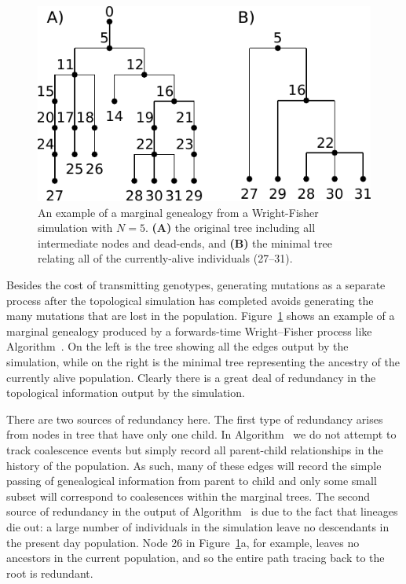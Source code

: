 \documentclass{article}
\begin{document}
\begin{figure}
    \begin{center}
        \includegraphics{wf-before-after}
    \end{center}
    \caption{An example of a marginal genealogy from a Wright-Fisher simulation
    with $N=5$. \textbf{(A)} the original tree including all
    intermediate nodes and dead-ends, and \textbf{(B)} the minimal tree
    relating all of the currently-alive individuals (27--31).
    \label{fig:wf-trees}
    }
\end{figure}

Besides the cost of transmitting genotypes,
generating mutations as a separate process after the topological simulation has completed 
avoids generating the many mutations that are lost in the population. 
Figure~\ref{fig:wf-trees} shows
an example of a marginal genealogy produced by a forwards-time Wright--Fisher
process like Algorithm~. 
On the left is the tree showing all the edges output by the simulation, 
while on the right
is the minimal tree representing the ancestry of the currently alive
population. Clearly there is a great deal of redundancy in the topological
information output by the simulation.

There are two sources of redundancy here. The first type of redundancy arises
from nodes in tree that have only one child. In Algorithm~ we do
not attempt to track coalescence events but simply record all parent-child
relationships in the history of the population. As such, many of these edges
will record the simple passing of genealogical information from parent to child
and only some small subset will correspond to coalesences within the marginal
trees. The second source of redundancy in the output of Algorithm~
is due to the fact that lineages die out: a large number of
individuals in the simulation leave no descendants in the present day population. 
Node 26 in Figure~\ref{fig:wf-trees}a, for example, leaves no
ancestors in the current population, and so the entire path tracing back to
the root is redundant.
\end{document}
